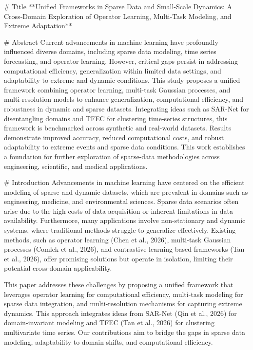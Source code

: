 # Title  
**Unified Frameworks in Sparse Data and Small-Scale Dynamics: A Cross-Domain Exploration of Operator Learning, Multi-Task Modeling, and Extreme Adaptation**

# Abstract  
Current advancements in machine learning have profoundly influenced diverse domains, including sparse data modeling, time series forecasting, and operator learning. However, critical gaps persist in addressing computational efficiency, generalization within limited data settings, and adaptability to extreme and dynamic conditions. This study proposes a unified framework combining operator learning, multi-task Gaussian processes, and multi-resolution models to enhance generalization, computational efficiency, and robustness in dynamic and sparse datasets. Integrating ideas such as SAR-Net for disentangling domains and TFEC for clustering time-series structures, this framework is benchmarked across synthetic and real-world datasets. Results demonstrate improved accuracy, reduced computational costs, and robust adaptability to extreme events and sparse data conditions. This work establishes a foundation for further exploration of sparse-data methodologies across engineering, scientific, and medical applications.

# Introduction  
Advancements in machine learning have centered on the efficient modeling of sparse and dynamic datasets, which are prevalent in domains such as engineering, medicine, and environmental sciences. Sparse data scenarios often arise due to the high costs of data acquisition or inherent limitations in data availability. Furthermore, many applications involve non-stationary and dynamic systems, where traditional methods struggle to generalize effectively. Existing methods, such as operator learning (Chen et al., 2026), multi-task Gaussian processes (Comlek et al., 2026), and contrastive learning-based frameworks (Tan et al., 2026), offer promising solutions but operate in isolation, limiting their potential cross-domain applicability.

This paper addresses these challenges by proposing a unified framework that leverages operator learning for computational efficiency, multi-task modeling for sparse data integration, and multi-resolution mechanisms for capturing extreme dynamics. This approach integrates ideas from SAR-Net (Qin et al., 2026) for domain-invariant modeling and TFEC (Tan et al., 2026) for clustering multivariate time series. Our contributions aim to bridge the gaps in sparse data modeling, adaptability to domain shifts, and computational efficiency.

